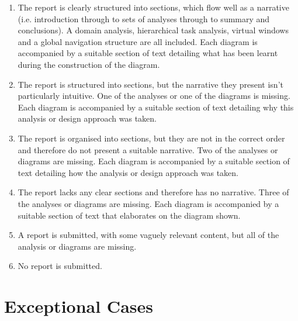 \documentclass[11pt]{article}
\begin{document}
\begin{enumerate}[label=(\Alph*)]

\item The report is clearly structured into sections, which flow well as a narrative (i.e. introduction through to sets of analyses through to summary and conclusions). A domain analysis, hierarchical task analysis, virtual windows and a global navigation structure are all included. Each diagram is accompanied by a suitable section of text detailing what has been learnt during the construction of the diagram.

\item The report is structured into sections, but the narrative they present isn't particularly intuitive. One of the analyses or one of the diagrams is missing. Each diagram is accompanied by a suitable section of text detailing why this analysis or design approach was taken.

\item The report is organised into sections, but they are not in the correct order and therefore do not present a suitable narrative. Two of the analyses or diagrams are missing. Each diagram is accompanied by a suitable section of text detailing how the analysis or design approach was taken.

\item The report lacks any clear sections and therefore has no narrative. Three of the analyses or diagrams are missing. Each diagram is accompanied by a suitable section of text that elaborates on the diagram shown.

\item A report is submitted, with some vaguely relevant content, but all of the analysis or diagrams are missing. 

\item No report is submitted.

\end{enumerate}

\section{Exceptional Cases}
\end{document}
